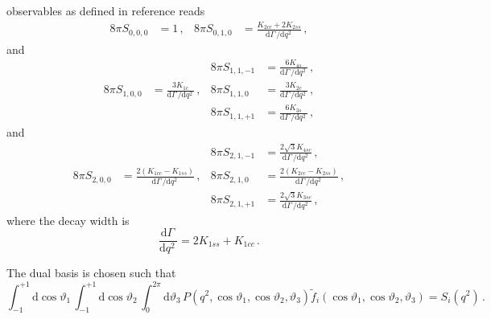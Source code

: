 \documentclass[aps,prd,reprint,nofootinbib,preprintnumbers]{revtex4}
\newcommand{\dual}[1]{\tilde{#1}}
\newcommand{\rmdx}[1]{\mbox{d} #1 \,} %
\renewcommand{\theta}{\vartheta}
\begin{document}
observables as defined in reference \cite{Boeer:2014xx} reads
\begin{equation}
\begin{aligned}
    8\pi S_{0, 0,  0} & = 1\,,                                                             &
    8\pi S_{0, 1,  0} & = \frac{K_{2cc} + 2 K_{2ss}}{\rmdx\Gamma/\rmdx{q^2}}\,,
\end{aligned}
\end{equation}
and
\begin{equation}
\begin{aligned}
%
                      &                                                                    &
    8\pi S_{1, 1, -1} & = \frac{6 K_{4s}}{\rmdx\Gamma/\rmdx{q^2}}\,,                       \\
%
    8\pi S_{1, 0,  0} & = \frac{3 K_{1c}}{\rmdx\Gamma/\rmdx{q^2}}\,,                       &
    8\pi S_{1, 1,  0} & = \frac{3 K_{2c}}{\rmdx\Gamma/\rmdx{q^2}}\,,                       \\
%
                      &                                                                    &
    8\pi S_{1, 1, +1} & = \frac{6 K_{3s}}{\rmdx\Gamma/\rmdx{q^2}}\,,
\end{aligned}
\end{equation}
and
\begin{equation}
\begin{aligned}
%
                      &                                                                    &
    8\pi S_{2, 1, -1} & = \frac{2 \sqrt{3} K_{4sc}}{\rmdx\Gamma/\rmdx{q^2}}\,,             \\
%
    8\pi S_{2, 0,  0} & = \frac{2(K_{1cc} - K_{1ss})}{\rmdx\Gamma/\rmdx{q^2}}\,,           &
    8\pi S_{2, 1,  0} & = \frac{2(K_{2cc} - K_{2ss})}{\rmdx\Gamma/\rmdx{q^2}}\,,           \\
%
                      &                                                                    &
    8\pi S_{2, 1, +1} & = \frac{2 \sqrt{3} K_{3sc}}{\rmdx\Gamma/\rmdx{q^2}}\,,
\end{aligned}
\end{equation}
where the decay width is
\begin{equation}
    \frac{\rmdx{\Gamma}} {\rmdx{q^2}} = 2 K_{1ss} + K_{1cc}\,.
\end{equation}

The dual basis is chosen such that
\begin{equation}
    \int_{-1}^{+1} \rmdx{\cos \theta_1} \int_{-1}^{+1} \rmdx{\cos \theta_2} \int_0^{2\pi} \rmdx{\theta_3} P(q^2, \cos \theta_1, \cos \theta_2, \theta_3) \dual{f}_i(\cos \theta_1, \cos \theta_2, \theta_3) = S_i(q^2)\,.
\end{equation}
\end{document}
